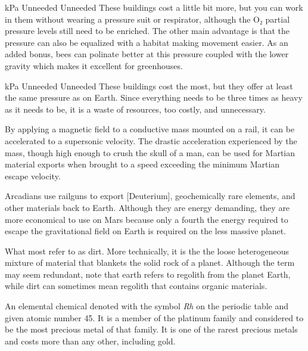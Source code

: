 {{    \bTR
       kPa \eTC
      \bTC Unneeded \eTC
      \bTC Unneeded \eTC
      \bTC These buildings cost a little bit more, but you can work in them without wearing a pressure suit or respirator, although the O₂ partial pressure levels still need to be enriched. The other main advantage is that the pressure can also be equalized with a habitat making movement easier. As an added bonus, bees can polinate better at this pressure coupled with the lower gravity which makes it excellent for greenhouses. \eTC
    \eTR

    \bTR
       kPa \eTC
      \bTC Unneeded \eTC
      \bTC Unneeded \eTC
      \bTC These buildings cost the most, but they offer at least the same pressure as on Earth. Since everything needs to be three times as heavy as it needs to be, it is a waste of resources, too costly, and unnecessary. \eTC
    \eTR
    \eTABLEbody

\eTABLE
}
\stopdefinition

By applying a magnetic field to a conductive mass mounted on a rail, it can be accelerated to a supersonic velocity. The drastic acceleration experienced by the mass, though high enough to crush the skull of a man, can be used for Martian material exports when brought to a speed exceeding the minimum Martian escape velocity.

Arcadians use railguns to export [Deuterium], geochemically rare elements, and other materials back to Earth. Although they are energy demanding, they are more economical to use on Mars because only a fourth the energy required to escape the gravitational field on Earth is required on the less massive planet.
\stopdefinition

What most refer to as dirt. More technically, it is the the loose heterogeneous mixture of material that blankets the solid rock of a planet. Although the term may seem redundant, note that earth refers to regolith from the planet Earth, while dirt can sometimes mean regolith that contains organic materials.
\stopdefinition

An elemental chemical denoted with the symbol {\it Rh} on the periodic table and given atomic number 45. It is a member of the platinum family and considered to be the most precious metal of that family. It is one of the rarest precious metals and costs more than any other, including gold.

}
